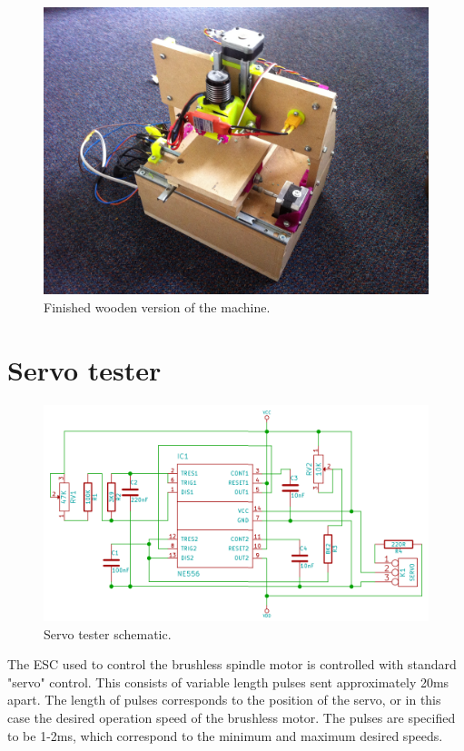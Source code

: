 \begin{figure}[ht!]
\centering
\includegraphics[width=160mm]{resources/finished.jpg}
\caption{Finished wooden version of the machine.}
\label{fig:finished}
\end{figure}

\newpage
\appendix
\appendixpage
\addappheadtotoc
\section{Servo tester}

\begin{figure}[ht!]
\centering
\includegraphics[width=160mm]{resources/servoexerciser.png}
\caption{Servo tester schematic.}
\label{fig:servotesterschem}
\end{figure}

The ESC used to control the brushless spindle motor is controlled with standard "servo" control. This consists of variable length pulses sent approximately 20ms apart.
The length of pulses corresponds to the position of the servo, or in this case the desired operation speed of the brushless motor. The pulses are specified to be 1-2ms,
which correspond to the minimum and maximum desired speeds.

